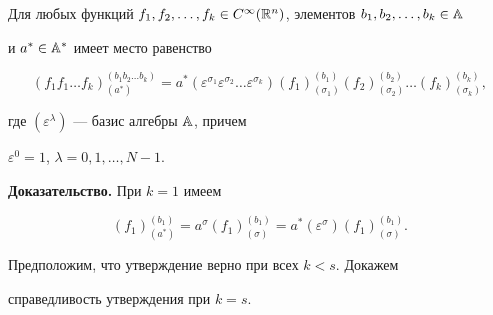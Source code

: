  


\begin{props} Для любых функций $f_1,f_2,\dotsc,f_k\in C^\infty(\Bbb 


R^n)$, элементов $b_1,b_2,\dotsc,b_k\in\Bbb A$ 


и $a^*\in\Bbb A^*$ имеет место равенство 


$$ 


(f_1f_1\dotsc f_k)^{(b_1b_2\dotsc b_k)}_{(a^*)}= 


a^*(\varepsilon^{\sigma_1}\varepsilon^{\sigma_2}\dotsc 


\varepsilon^{\sigma_k})(f_1)^{(b_1)}_{(\sigma_1)} 


(f_2)^{(b_2)}_{(\sigma_2)}\dotsc(f_k)^{(b_k)}_{(\sigma_k)}, 


$$ 


где $(\varepsilon^\lambda)$ --- базис алгебры $\Bbb A$, причем 


$\varepsilon^0=1$, $\lambda=0,1,\dotsc,N-1$. 


\end{props} 


 


{\bf Доказательство.} При $k=1$ имеем 


$$ 


(f_1)^{(b_1)}_{(a^*)}=a^\sigma(f_1)^{(b_1)}_{(\sigma)}= 


a^*(\varepsilon^\sigma)(f_1)^{(b_1)}_{(\sigma)}. 


$$ 


Предположим, что утверждение верно при всех $k<s$. Докажем 


справедливость утверждения при $k=s$. 


